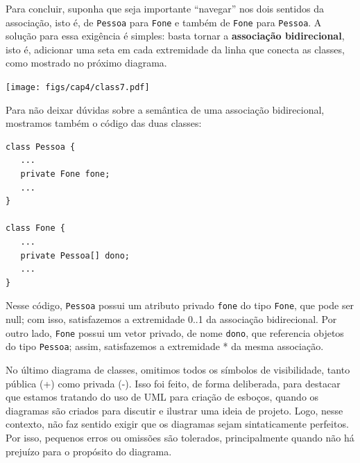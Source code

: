 \documentclass[
  11pt,
  twoside]{book}
\newcommand{\passthrough}[1]{#1}
\begin{document}
Para concluir, suponha que seja importante ``navegar'' nos dois sentidos
da associação, isto é, de \passthrough{\lstinline!Pessoa!} para
\passthrough{\lstinline!Fone!} e também de
\passthrough{\lstinline!Fone!} para \passthrough{\lstinline!Pessoa!}. A
solução para essa exigência é simples: basta tornar a \textbf{associação
bidirecional}, isto é, adicionar uma seta em cada extremidade da linha
que conecta as classes, como mostrado no próximo diagrama.

\texttt{[image: figs/cap4/class7.pdf]}

Para não deixar dúvidas sobre a semântica de uma associação
bidirecional, mostramos também o código das duas classes:

\begin{lstlisting}
class Pessoa {
   ...
   private Fone fone;
   ...
}

class Fone {
   ...
   private Pessoa[] dono;
   ...
}
\end{lstlisting}

Nesse código, \passthrough{\lstinline!Pessoa!} possui um atributo
privado \passthrough{\lstinline!fone!} do tipo
\passthrough{\lstinline!Fone!}, que pode ser null; com isso,
satisfazemos a extremidade 0..1 da associação bidirecional. Por outro
lado, \passthrough{\lstinline!Fone!} possui um vetor privado, de nome
\passthrough{\lstinline!dono!}, que referencia objetos do tipo
\passthrough{\lstinline!Pessoa!}; assim, satisfazemos a extremidade * da
mesma associação.

No último diagrama de classes, omitimos todos os símbolos de
visibilidade, tanto pública (+) como privada (-). Isso foi feito, de
forma deliberada, para destacar que estamos tratando do uso de UML para
criação de esboços, quando os diagramas são criados para discutir e
ilustrar uma ideia de projeto. Logo, nesse contexto, não faz sentido
exigir que os diagramas sejam sintaticamente perfeitos. Por isso,
pequenos erros ou omissões são tolerados, principalmente quando não há
prejuízo para o propósito do diagrama.
\end{document}
